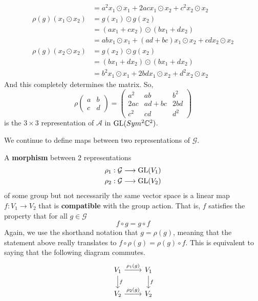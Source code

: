 \begin{example}
\begin{align*}
      & = a^2 x_1 \odot x_1 + 2ac x_1 \odot x_2 + c^2 x_2 \odot x_2 \\
      \rho(g) (x_1 \odot x_2) & = g(x_1) \odot g(x_2) \\
      & = (a x_1 + c x_2) \odot (b x_1 + d x_2) \\
      & = ab x_1 \odot x_1 + (ad + bc) x_1 \odot x_2 + cd x_2 \odot x_2 \\
      \rho(g) (x_2 \odot x_2) & = g(x_2) \odot g(x_2) \\
      & = (b x_1 + d x_2) \odot (b x_1 + d x_2) \\
      & = b^2 x_1 \odot x_1 + 2bd x_1 \odot x_2 + d^2 x_2 \odot x_2
    \end{align*}
    And this completely determines the matrix. So, 
    \begin{equation}
      \rho \begin{pmatrix}
      a&b\\c&d
      \end{pmatrix} = \begin{pmatrix}
      a^2&ab&b^2\\2ac&ad+bc&2bd\\c^2&cd&d^2
      \end{pmatrix}
    \end{equation}
    is the $3 \times 3$ representation of $\mathcal{A}$ in $\operatorname{GL}(Sym^2 \mathbb{C}^2)$. 
  \end{example}

  We continue to define maps between two representations of $\mathcal{G}$. 

  \begin{definition}
    A \textbf{morphism} between 2 representations 
    \begin{align*}
      & \rho_1: \mathcal{G} \longrightarrow \operatorname{GL}(V_1) \\
      & \rho_2: \mathcal{G} \longrightarrow \operatorname{GL}(V_2) 
    \end{align*}
    of some group but not necessarily the same vector space is a linear map $f: V_1 \longrightarrow V_2$ that is \textbf{compatible} with the group action. That is, $f$ satisfies the property that for all $g \in \mathcal{G}$
    \begin{equation}
      f \circ g = g \circ f
    \end{equation}
    Again, we use the shorthand notation that $g = \rho(g)$, meaning that the statement above really translates to $ f \circ \rho(g) = \rho(g) \circ f$. This is equivalent to saying that the following diagram commutes. 
    \[\begin{tikzcd}
    V_1 \arrow{r}{\rho_1(g)} \arrow{d}{f} & V_1 \arrow{d}{f} \\
    V_2 \arrow{r}{\rho_2 (g)} & V_2
    \end{tikzcd}\]
  \end{definition}

